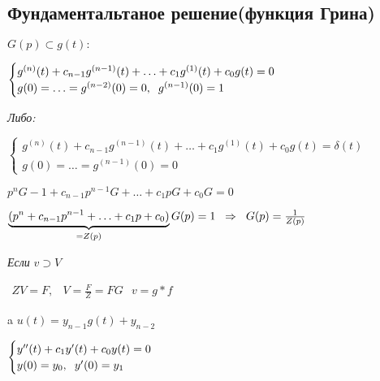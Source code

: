 \newpage

\subsection{Фундаментальтаное решение(функция Грина)}

\vspace{0.5cm}
$
G(p) \subset g(t) :
$

\vspace{0.5cm}
$
\begin{cases}
	g^{(n)}(t) + c_{n-1}g^{(n-1)}(t)+\ldots + c_1g^{(1)}(t) +c_0g(t) = 0 \\
	g(0) =  \ldots =g^{(n-2)}(0) = 0,\text{\hspace{0.2cm}} g^{(n-1)}(0) = 1
\end{cases}
$

\vspace{0.5cm}
\begin{Large}
\textit{Либо:}
\end{Large}

\vspace{0.5cm}
$
\begin{cases}
	g^{(n)}(t) + c_{n-1}g^{(n-1)}(t)+\ldots + c_1g^{(1)}(t) +c_0g(t) = \delta(t)\\
	g(0) =  \ldots =g^{(n-1)}(0) = 0
\end{cases}
$

\vspace{0.5cm}
$
p^n G - 1 + c_{n-1}p^{n-1}G + \ldots + c_1pG +c_0G = 0
$

\vspace{0.5cm}
$
\underbrace{(p^n + c_{n-1}p^{n-1} + \ldots + c_1p + c_0)}_{ = Z(p)} G(p) = 1 \text{\hspace{0.2cm}} \Rightarrow \text{\hspace{0.2cm}} G(p) = \frac{1}{Z(p)}
$

\vspace{0.5cm}
\textit{Если \text{\hspace{0.2cm}}}
$
v \supset V
$

$
\begin{matrix}
ZV=F, & V = \frac{F}{Z} = FG
\end{matrix}
$
\text{\hspace{2cm}}
$
v = g\ast f
$

\vspace{0.5cm}
a\text{\hspace{0.2cm}}
$
u(t) = y_{n-1}g(t) + y_{n-2}
$

\vspace{0.5cm}
$
\begin{cases}
	y^{\prime\prime}(t) + c_1y^{\prime}(t) + c_0y(t) = 0 \\
	y(0) = y_0,\text{\hspace{0.2cm}}y^{\prime}(0) = y_1
\end{cases}
$

